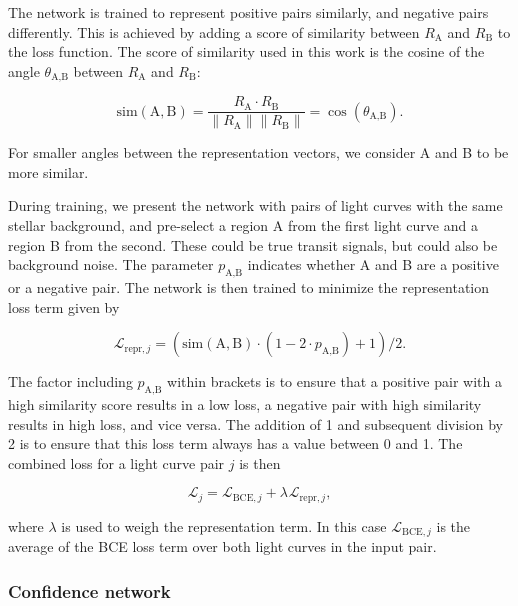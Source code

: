 The network is trained to represent positive pairs similarly, and negative pairs differently. This is achieved by adding a score of similarity between $R_\text{A}$ and $R_\text{B}$ to the loss function. The score of similarity used in this work is the cosine of the angle $\theta_{\text{A}, \text{B}}$ between $R_\text{A}$ and $R_\text{B}$:

\begin{equation}
    \text{sim}(\text{A}, \text{B})  = \frac{R_\text{A} \cdot R_\text{B}}{\|R_\text{A}\|\|R_\text{B}\|} = \cos(\theta_{\text{A}, \text{B}}).
\end{equation}

\noindent For smaller angles between the representation vectors, we consider A and B to be more similar. 

During training, we present the network with pairs of light curves with the same stellar background, and pre-select a region A from the first light curve and a region B from the second. These could be true transit signals, but could also be background noise. The parameter $p_{\text{A},\text{B}}$ indicates whether A and B are a positive or a negative pair. The network is then trained to minimize the representation loss term given by

\begin{equation}
   \mathcal{L}_{\text{repr}, j} =(\text{sim}(\text{A}, \text{B}) \cdot(1 - 2 \cdot p_{\text{A},\text{B}}) + 1) / 2.
\end{equation}

\noindent The factor including $p_{\text{A},\text{B}}$ within brackets is to ensure that a positive pair with a high similarity score results in a low loss, a negative pair with high similarity results in high loss, and vice versa. The addition of 1 and subsequent division by 2 is to ensure that this loss term always has a value between 0 and 1. The combined loss for a light curve pair $j$ is then 

\begin{equation}
    \mathcal{L}_{j} = \mathcal{L}_{\text{BCE}, j} + \lambda_{} \mathcal{L}_{\text{repr}, j},
\end{equation}

\noindent where $\lambda$ is used to weigh the representation term. In this case $\mathcal{L}_{\text{BCE}, j}$ is the average of the BCE loss term over both light curves in the input pair.

\subsubsection{Confidence network}

